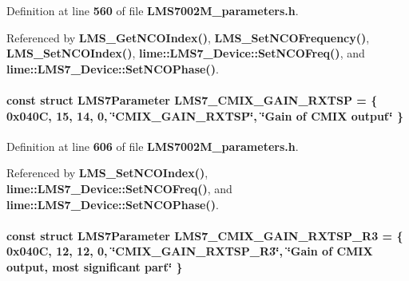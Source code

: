 Definition at line {\bf 560} of file {\bf L\+M\+S7002\+M\+\_\+parameters.\+h}.



Referenced by {\bf L\+M\+S\+\_\+\+Get\+N\+C\+O\+Index()}, {\bf L\+M\+S\+\_\+\+Set\+N\+C\+O\+Frequency()}, {\bf L\+M\+S\+\_\+\+Set\+N\+C\+O\+Index()}, {\bf lime\+::\+L\+M\+S7\+\_\+\+Device\+::\+Set\+N\+C\+O\+Freq()}, and {\bf lime\+::\+L\+M\+S7\+\_\+\+Device\+::\+Set\+N\+C\+O\+Phase()}.

\paragraph[{L\+M\+S7\+\_\+\+C\+M\+I\+X\+\_\+\+G\+A\+I\+N\+\_\+\+R\+X\+T\+SP}]{\setlength{\rightskip}{0pt plus 5cm}const struct {\bf L\+M\+S7\+Parameter} L\+M\+S7\+\_\+\+C\+M\+I\+X\+\_\+\+G\+A\+I\+N\+\_\+\+R\+X\+T\+SP = \{ 0x040\+C, 15, 14, 0, \char`\"{}\+C\+M\+I\+X\+\_\+\+G\+A\+I\+N\+\_\+\+R\+X\+T\+S\+P\char`\"{}, \char`\"{}\+Gain of C\+M\+I\+X output\char`\"{} \}\hspace{0.3cm}{\ttfamily [static]}}\label{LMS7002M__parameters_8h_a172f1db5778585c0f42b5cb483bde69a}


Definition at line {\bf 606} of file {\bf L\+M\+S7002\+M\+\_\+parameters.\+h}.



Referenced by {\bf L\+M\+S\+\_\+\+Set\+N\+C\+O\+Index()}, {\bf lime\+::\+L\+M\+S7\+\_\+\+Device\+::\+Set\+N\+C\+O\+Freq()}, and {\bf lime\+::\+L\+M\+S7\+\_\+\+Device\+::\+Set\+N\+C\+O\+Phase()}.

\paragraph[{L\+M\+S7\+\_\+\+C\+M\+I\+X\+\_\+\+G\+A\+I\+N\+\_\+\+R\+X\+T\+S\+P\+\_\+\+R3}]{\setlength{\rightskip}{0pt plus 5cm}const struct {\bf L\+M\+S7\+Parameter} L\+M\+S7\+\_\+\+C\+M\+I\+X\+\_\+\+G\+A\+I\+N\+\_\+\+R\+X\+T\+S\+P\+\_\+\+R3 = \{ 0x040\+C, 12, 12, 0, \char`\"{}\+C\+M\+I\+X\+\_\+\+G\+A\+I\+N\+\_\+\+R\+X\+T\+S\+P\+\_\+\+R3\char`\"{}, \char`\"{}\+Gain of C\+M\+I\+X output, most significant part\char`\"{} \}\hspace{0.3cm}{\ttfamily [static]}}\label{LMS7002M__parameters_8h_a670bb3ac78a85fcb246ab29d6bdb84dd}


